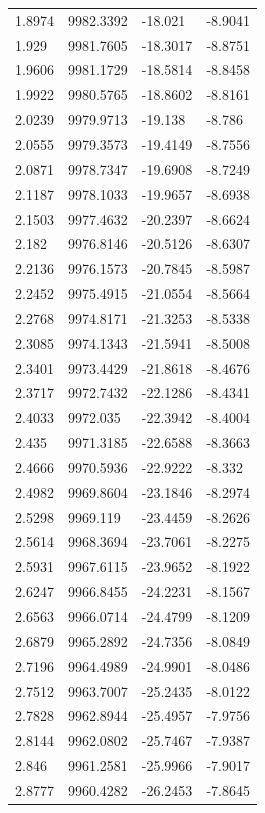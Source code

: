 \begin{table}[H]
\begin{tabular}{llll}
1.8974 & 9982.3392 & -18.021 & -8.9041 \\
1.929 & 9981.7605 & -18.3017 & -8.8751 \\
1.9606 & 9981.1729 & -18.5814 & -8.8458 \\
1.9922 & 9980.5765 & -18.8602 & -8.8161 \\
2.0239 & 9979.9713 & -19.138 & -8.786 \\
2.0555 & 9979.3573 & -19.4149 & -8.7556 \\
2.0871 & 9978.7347 & -19.6908 & -8.7249 \\
2.1187 & 9978.1033 & -19.9657 & -8.6938 \\
2.1503 & 9977.4632 & -20.2397 & -8.6624 \\
2.182 & 9976.8146 & -20.5126 & -8.6307 \\
2.2136 & 9976.1573 & -20.7845 & -8.5987 \\
2.2452 & 9975.4915 & -21.0554 & -8.5664 \\
2.2768 & 9974.8171 & -21.3253 & -8.5338 \\
2.3085 & 9974.1343 & -21.5941 & -8.5008 \\
2.3401 & 9973.4429 & -21.8618 & -8.4676 \\
2.3717 & 9972.7432 & -22.1286 & -8.4341 \\
2.4033 & 9972.035 & -22.3942 & -8.4004 \\
2.435 & 9971.3185 & -22.6588 & -8.3663 \\
2.4666 & 9970.5936 & -22.9222 & -8.332 \\
2.4982 & 9969.8604 & -23.1846 & -8.2974 \\
2.5298 & 9969.119 & -23.4459 & -8.2626 \\
2.5614 & 9968.3694 & -23.7061 & -8.2275 \\
2.5931 & 9967.6115 & -23.9652 & -8.1922 \\
2.6247 & 9966.8455 & -24.2231 & -8.1567 \\
2.6563 & 9966.0714 & -24.4799 & -8.1209 \\
2.6879 & 9965.2892 & -24.7356 & -8.0849 \\
2.7196 & 9964.4989 & -24.9901 & -8.0486 \\
2.7512 & 9963.7007 & -25.2435 & -8.0122 \\
2.7828 & 9962.8944 & -25.4957 & -7.9756 \\
2.8144 & 9962.0802 & -25.7467 & -7.9387 \\
2.846 & 9961.2581 & -25.9966 & -7.9017 \\
2.8777 & 9960.4282 & -26.2453 & -7.8645 \\

\end{tabular}
\end{table}
